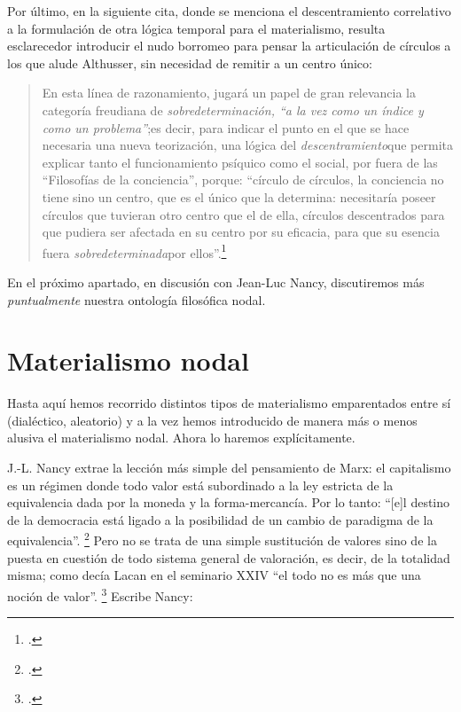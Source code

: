 Por último, en la siguiente cita, donde se menciona el descentramiento correlativo a la formulación de otra lógica temporal para el materialismo, resulta esclarecedor introducir el nudo borromeo para pensar la articulación de círculos a los que alude Althusser, sin necesidad de remitir a un centro único:

\begin{quote}
En esta línea de razonamiento, jugará un papel de gran relevancia la categoría freudiana de \emph{sobredeterminación, \enquote{a la vez como un índice y como un problema}};es decir, para indicar el punto en el que se hace necesaria una nueva teorización, una lógica del \emph{descentramiento}que permita explicar tanto el funcionamiento psíquico como el social, por fuera de las \enquote{Filosofías de la conciencia}, porque: \enquote{círculo de círculos, la conciencia no tiene sino un centro, que es el único que la determina: necesitaría poseer círculos que tuvieran otro centro que el de ella, círculos descentrados para que pudiera ser afectada en su centro por su eficacia, para que su esencia fuera \emph{sobredeterminada}por ellos}.\footcite[][]{@7075-ROME2009}
\end{quote}

En el próximo apartado, en discusión con Jean-Luc Nancy, discutiremos más \emph{puntualmente} nuestra ontología filosófica nodal.

\section{Materialismo nodal} %

Hasta aquí hemos recorrido distintos tipos de materialismo emparentados entre sí (dialéctico, aleatorio) y a la vez hemos introducido de manera más o menos alusiva el materialismo nodal. Ahora lo haremos explícitamente.

J.-L. Nancy extrae  la lección más simple del pensamiento de Marx: el capitalismo es un régimen donde todo valor está subordinado a la ley estricta de la equivalencia dada por la moneda y la forma-mercancía. Por lo tanto: \enquote{{[}e{]}l destino de la democracia está ligado a la posibilidad de un cambio de paradigma de la equivalencia}. \footcite[44]{@7012-NANCY2009} Pero no se trata de una simple sustitución de valores sino de la puesta en cuestión de todo sistema general de valoración, es decir, de la totalidad misma; como decía Lacan en el seminario XXIV \enquote{el todo no es más que una noción de valor}. \footcite[15]{@7067-LACAN1988} Escribe Nancy:

